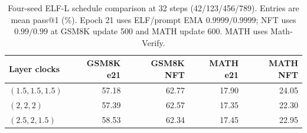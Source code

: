 \begin{table}[t]
\caption{Four-seed ELF-L schedule comparison at 32 steps (42/123/456/789). Entries are mean pass@1 (\%). Epoch 21 uses ELF/prompt EMA $0.9999/0.9999$; NFT uses $0.99/0.99$ at GSM8K update 500 and MATH update 600. MATH uses Math-Verify.}
\label{tab:schedules}
\centering\small
\setlength{\tabcolsep}{4pt}
\begin{tabular}{lrrrr}
\toprule
Layer clocks & GSM8K e21 & GSM8K NFT & MATH e21 & MATH NFT \\
\midrule
$(1.5,1.5,1.5)$ & 57.18 & 62.77 & 17.90 & 24.05 \\
$(2,2,2)$ & 57.39 & 62.57 & 17.35 & 22.30 \\
$(2.5,2,1.5)$ & 58.53 & 62.34 & 17.45 & 22.95 \\
\bottomrule
\end{tabular}
\end{table}
